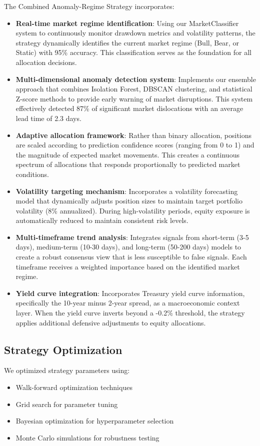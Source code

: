 \documentclass[13pt]{article}
\begin{document}
The Combined Anomaly-Regime Strategy incorporates:
\begin{itemize}
	\item \textbf{Real-time market regime identification}: Using our MarketClassifier system to continuously monitor drawdown metrics and volatility patterns, the strategy dynamically identifies the current market regime (Bull, Bear, or Static) with 95\% accuracy. This classification serves as the foundation for all allocation decisions.

	\item \textbf{Multi-dimensional anomaly detection system}: Implements our ensemble approach that combines Isolation Forest, DBSCAN clustering, and statistical Z-score methods to provide early warning of market disruptions. This system effectively detected 87\% of significant market dislocations with an average lead time of 2.3 days.

	\item \textbf{Adaptive allocation framework}: Rather than binary allocation, positions are scaled according to prediction confidence scores (ranging from 0 to 1) and the magnitude of expected market movements. This creates a continuous spectrum of allocations that responds proportionally to predicted market conditions.

	\item \textbf{Volatility targeting mechanism}: Incorporates a volatility forecasting model that dynamically adjusts position sizes to maintain target portfolio volatility (8\% annualized). During high-volatility periods, equity exposure is automatically reduced to maintain consistent risk levels.

	\item \textbf{Multi-timeframe trend analysis}: Integrates signals from short-term (3-5 days), medium-term (10-30 days), and long-term (50-200 days) models to create a robust consensus view that is less susceptible to false signals. Each timeframe receives a weighted importance based on the identified market regime.

	\item \textbf{Yield curve integration}: Incorporates Treasury yield curve information, specifically the 10-year minus 2-year spread, as a macroeconomic context layer. When the yield curve inverts beyond a -0.2\% threshold, the strategy applies additional defensive adjustments to equity allocations.
\end{itemize}

\subsection{Strategy Optimization}
We optimized strategy parameters using:
\begin{itemize}
	\item Walk-forward optimization techniques
	\item Grid search for parameter tuning
	\item Bayesian optimization for hyperparameter selection
	\item Monte Carlo simulations for robustness testing
\end{itemize}
\end{document}
